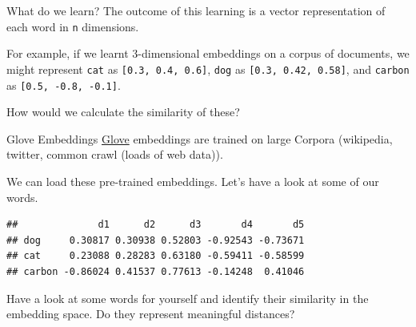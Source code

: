 \documentclass[
  10pt,
  ignorenonframetext,
  aspectratio=169]{beamer}
\newenvironment{Shaded}{\begin{snugshade}}{\end{snugshade}}
\newcommand{\AttributeTok}[1]{\textcolor[rgb]{0.80,0.80,0.80}{#1}}
\newcommand{\DecValTok}[1]{\textcolor[rgb]{0.86,0.86,0.80}{#1}}
\newcommand{\FunctionTok}[1]{\textcolor[rgb]{0.94,0.94,0.56}{#1}}
\newcommand{\NormalTok}[1]{\textcolor[rgb]{0.80,0.80,0.80}{#1}}
\newcommand{\OtherTok}[1]{\textcolor[rgb]{0.94,0.94,0.56}{#1}}
\newcommand{\SpecialCharTok}[1]{\textcolor[rgb]{0.86,0.64,0.64}{#1}}
\newcommand{\StringTok}[1]{\textcolor[rgb]{0.80,0.58,0.58}{#1}}
\begin{document}
\begin{frame}[fragile]{What do we learn?}
\protect\hypertarget{what-do-we-learn}{}
The outcome of this learning is a vector representation of each word in
\texttt{n} dimensions.

For example, if we learnt 3-dimensional embeddings on a corpus of
documents, we might represent \texttt{cat} as
\texttt{{[}0.3,\ 0.4,\ 0.6{]}}, \texttt{dog} as
\texttt{{[}0.3,\ 0.42,\ 0.58{]}}, and \texttt{carbon} as
\texttt{{[}0.5,\ -0.8,\ -0.1{]}}.

How would we calculate the similarity of these?
\end{frame}

\begin{frame}[fragile]{Glove Embeddings}
\protect\hypertarget{glove-embeddings}{}
\href{https://nlp.stanford.edu/projects/glove/}{Glove} embeddings are
trained on large Corpora (wikipedia, twitter, common crawl (loads of web
data)).

We can load these pre-trained embeddings. Let's have a look at some of
our words.

\medskip
\scriptsize

\begin{Shaded}
\end{Shaded}

\begin{verbatim}
##              d1      d2      d3       d4       d5
## dog     0.30817 0.30938 0.52803 -0.92543 -0.73671
## cat     0.23088 0.28283 0.63180 -0.59411 -0.58599
## carbon -0.86024 0.41537 0.77613 -0.14248  0.41046
\end{verbatim}

Have a look at some words for yourself and identify their similarity in
the embedding space. Do they represent meaningful distances?
\end{frame}
\end{document}
